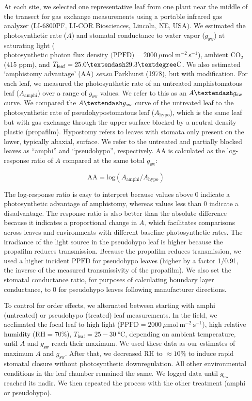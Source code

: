 \documentclass[
  letterpaper,
  DIV=11,
  numbers=noendperiod]{scrartcl}
\begin{document}
At each site, we selected one representative leaf from one plant near
the middle of the transect for gas exchange measurements using a
portable infrared gas analyzer (LI-6800PF, LI-COR Biosciences, Lincoln,
NE, USA). We estimated the photosynthetic rate (\(A\)) and stomatal
conductance to water vapor (\(g_\text{sw}\)) at saturating light
(\(\text{photosynthetic photon flux density (PPFD)} = 2000~\mu \text{mol}~\text{m}^{-2}~\text{s}^{-1}\)),
ambient CO\(_2\) (415 ppm), and
\(T_\mathrm{leaf} = 25.0 \textendash 29.3° \text{C}\). We also estimated
`amphistomy advantage' (\(\mathrm{AA}\)) \emph{sensu} Parkhurst (1978),
but with modification. For each leaf, we measured the photosynthetic
rate of an untreated amphistomatous leaf (\(A_{\mathrm{amphi}}\)) over a
range of \(g_\text{sw}\) values. We refer to this as an
\(A \textendash g_\text{sw}\) curve. We compared the
\(A \textendash g_\text{sw}\) curve of the untreated leaf to the
photosynthetic rate of pseudohypostomatous leaf (\(A_\mathrm{hypo}\)),
which is the same leaf but with gas exchange through the upper surface
blocked by a neutral density plastic (propafilm). Hypostomy refers to
leaves with stomata only present on the lower, typically abaxial,
surface. We refer to the untreated and partially blocked leaves as
``amphi'' and ``pseudohypo'', respectively. \(\mathrm{AA}\) is
calculated as the log-response ratio of \(A\) compared at the same total
\(g_\text{sw}\):

\[\mathrm{AA} = \mathrm{log}(A_{\mathrm{amphi}} / A_{\mathrm{hypo}})\]

The log-response ratio is easy to interpret because values above 0
indicate a photosynthetic advantage of amphistomy, whereas values less
than 0 indicate a disadvantage. The response ratio is also better than
the absolute difference because it indicates a proportional change in
\(A\), which facilitates comparisons across leaves and environments with
different baseline photosynthetic rates. The irradiance of the light
source in the pseudohypo leaf is higher because the propafilm reduces
transmission. Because the propafilm reduces transmission, we used a
higher incident \(\mathrm{PPFD}\) for pseudohypo leaves (higher by a
factor 1/0.91, the inverse of the measured transmissivity of the
propafilm). We also set the stomatal conductance ratio, for purposes of
calculating boundary layer conductance, to 0 for pseudohypo leaves
following manufacturer directions.

To control for order effects, we alternated between starting with amphi
(untreated) or pseudohypo (treated) leaf measurements. In the field, we
acclimated the focal leaf to high light
(\(\mathrm{PPFD} = 2000~\mu \text{mol}~\text{m}^{-2}~\text{s}^{-1}\)),
high relative humidity (\(\mathrm{RH} = 70\%\)),
\(T_\text{leaf} = 25-30~° \text{C}\), depending on ambient temperature,
until \(A\) and \(g_\text{sw}\) reach their maximum. We used these data
as our estimates of maximum \(A\) and \(g_\text{sw}\). After that, we
decreased \(\mathrm{RH}\) to \(\approx 10\%\) to induce rapid stomatal
closure without photosynthetic downregulation. All other environmental
conditions in the leaf chamber remained the same. We logged data until
\(g_\text{sw}\) reached its nadir. We then repeated the process with the
other treatment (amphi or pseudohypo).
\end{document}

